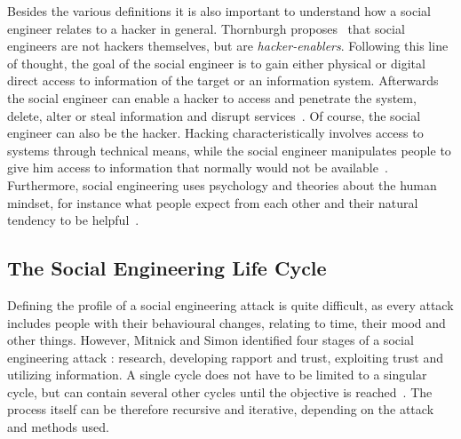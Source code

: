 Besides the various definitions it is also important to understand how a
social engineer relates to a hacker in general. Thornburgh
proposes~\cite{thornburgh2004} that social engineers are not hackers
themselves, but are \textit{hacker-enablers}. Following this line of thought,
the goal of the social engineer is to gain either physical or digital direct
access to information of the target or an information system. Afterwards the
social engineer can enable a hacker to access and penetrate the system, delete,
alter or steal information and disrupt services~\cite{thornburgh2004}. Of
course, the social engineer can also be the hacker. Hacking characteristically
involves access to systems through technical means, while the social engineer
manipulates people to give him access to information that normally would not
be available~\cite{jones2004}. Furthermore, social engineering uses psychology
and theories about the human mindset, for instance what people expect from each
other and their natural tendency to be helpful~\cite{jones2004}.


\subsection{The Social Engineering Life Cycle}

Defining the profile of a social engineering attack is quite difficult, as
every attack includes people with their behavioural changes, relating to time,
their mood and other things. However, Mitnick and Simon identified four stages
of a social engineering attack \cite{mitnick2003}: research, developing rapport
and trust, exploiting trust and utilizing information. A single cycle does not
have to be limited to a singular cycle, but can contain several other cycles
until the objective is reached~\cite{thornburgh2004}. The process itself can be
therefore recursive and iterative, depending on the attack and methods used.

